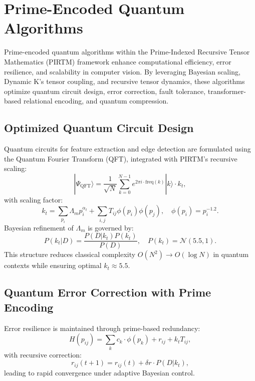 \documentclass{article}
\theoremstyle{plain}
\begin{document}
\section{Prime-Encoded Quantum Algorithms}
Prime-encoded quantum algorithms within the Prime-Indexed Recursive Tensor Mathematics (PIRTM) framework enhance computational efficiency, error resilience, and scalability in computer vision. By leveraging Bayesian scaling, Dynamic K’s tensor coupling, and recursive tensor dynamics, these algorithms optimize quantum circuit design, error correction, fault tolerance, transformer-based relational encoding, and quantum compression.

\subsection{Optimized Quantum Circuit Design}
Quantum circuits for feature extraction and edge detection are formulated using the Quantum Fourier Transform (QFT), integrated with PIRTM’s recursive scaling:
\begin{equation}
|\Psi_\text{QFT}\rangle = \frac{1}{\sqrt{N}} \sum_{k=0}^{N-1} e^{2\pi i \cdot \text{freq}(k)} |k\rangle \cdot k_t,
\end{equation}
with scaling factor:
\begin{equation}
k_t = \sum_{p_i} \Lambda_m p_i^{\alpha_t} + \sum_{i,j} T_{ij} \phi(p_i) \phi(p_j), \quad \phi(p_i) = p_i^{-1.2}.
\end{equation}
Bayesian refinement of \( \Lambda_m \) is governed by:
\begin{equation}
P(k_t | D) = \frac{P(D | k_t) P(k_t)}{P(D)}, \quad P(k_t) = \mathcal{N}(5.5, 1).
\end{equation}
This structure reduces classical complexity \( O(N^2) \to O(\log N) \) in quantum contexts while ensuring optimal \( k_t \approx 5.5 \).

\subsection{Quantum Error Correction with Prime Encoding}
Error resilience is maintained through prime-based redundancy:
\begin{equation}
H(p_{ij}) = \sum_{k} c_k \cdot \phi(p_k) + r_{ij} + k_t T_{ij},
\end{equation}
with recursive correction:
\begin{equation}
r_{ij}(t+1) = r_{ij}(t) + \delta r \cdot P(D | k_t),
\end{equation}
leading to rapid convergence under adaptive Bayesian control.
\end{document}
